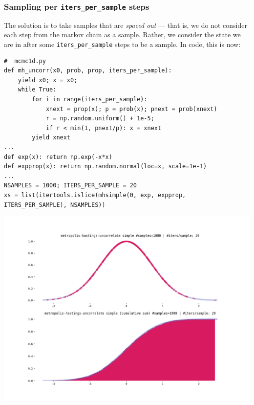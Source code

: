 \documentclass[titlepage]{article}
\begin{document}
\subsubsection{Sampling per \texttt{iters\_per\_sample} steps}

The solution is to take samples that are \emph{spaced out} --- that is,
we do not consider each step from the markov chain as a sample. Rather,
we consider the state we are in after some \texttt{iters\_per\_sample} steps to be a sample.
In code, this is now:

{\footnotesize
\begin{verbatim}
#  mcmc1d.py
def mh_uncorr(x0, prob, prop, iters_per_sample):
    yield x0; x = x0;
    while True:
        for i in range(iters_per_sample):
            xnext = prop(x); p = prob(x); pnext = prob(xnext)
            r = np.random.uniform() + 1e-5;
            if r < min(1, pnext/p): x = xnext
        yield xnext
...
def exp(x): return np.exp(-x*x)
def expprop(x): return np.random.normal(loc=x, scale=1e-1)
...
NSAMPLES = 1000; ITERS_PER_SAMPLE = 20
xs = list(itertools.islice(mhsimple(0, exp, expprop, ITERS_PER_SAMPLE), NSAMPLES))
\end{verbatim}
}

\includegraphics[width=\textwidth]{mcmc-mh-uncorr-1d-exp.png}
\end{document}
